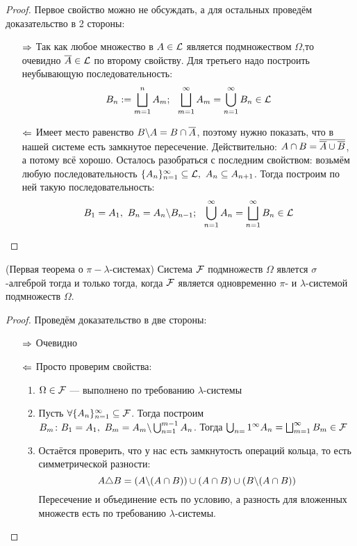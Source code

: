 \begin{proof}
	Первое свойство можно не обсуждать, а для остальных проведём доказательство в 2 стороны:
	\begin{itemize}
		\item[$\Rightarrow$] Так как любое множество в $A \in \mathcal{L}$ является подмножеством $\Omega$,то очевидно $\overline{A} \in \mathcal{L}$ по второму свойству. Для третьего надо построить неубывающую последовательность:
		\[
			B_n := \bigsqcup_{m = 1}^n A_m;\ \ \bigsqcup_{m = 1}^\infty A_m = \bigcup_{n = 1}^\infty B_n \in \mathcal{L}
		\]
		
		\item[$\Leftarrow$] Имеет место равенство $B \backslash A = B \cap \overline{A}$, поэтому нужно показать, что в нашей системе есть замкнутое пересечение. Действительно: $A \cap B = \overline{\overline{A} \cup \overline{B}}$, а потому всё хорошо. Осталось разобраться с последним свойством: возьмём любую последовательность $\{A_n\}_{n = 1}^\infty \subseteq \mathcal{L},\ A_n \subseteq A_{n + 1}$. Тогда построим по ней такую последовательность:
		\[
			B_1 = A_1,\ B_n = A_n \bs B_{n - 1};\ \ \bigcup_{n = 1}^\infty A_n = \bscup_{n = 1}^\infty B_n \in \cL
		\]
	\end{itemize}
\end{proof}

\begin{theorem} (Первая теорема о $\pi-\lambda$-системах)
	Система $\mathcal{F}$ подмножеств $\Omega$ явлется $\sigma$-алгеброй тогда и только тогда, когда $\mathcal{F}$ является одновременно $\pi$- и $\lambda$-системой подмножеств $\Omega$.
\end{theorem}

\begin{proof}
	Проведём доказательство в две стороны:
	\begin{itemize}
		\item[$\Rightarrow$] Очевидно
		
		\item[$\Leftarrow$] Просто проверим свойства:
		\begin{enumerate}
			\item $\Omega \in \mathcal{F}$ --- выполнено по требованию $\lambda$-системы
			
			\item Пусть $\forall \{A_n\}_{n = 1}^\infty \subseteq \mathcal{F}$. Тогда построим $B_m \colon B_1 = A_1,\ B_m = A_m \backslash \bigcup_{n = 1}^{m - 1} A_n$. Тогда $\bigcup_{n = }1^\infty A_n = \bigsqcup_{m = 1}^\infty B_m \in \mathcal{F}$
			
			\item Остаётся проверить, что у нас есть замкнутость операций кольца, то есть симметрической разности:
			\[
				A \triangle B = (A \backslash (A \cap B)) \cup (A \cap B) \cup (B \backslash (A \cap B))
			\]
			Пересечение и объединение есть по условию, а разность для вложенных множеств есть по требованию $\lambda$-системы.
		\end{enumerate}
	\end{itemize}
\end{proof}

